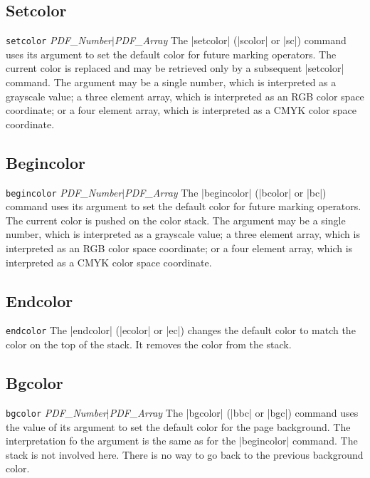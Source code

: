 {\subsection{Setcolor}
\syntax
{\tt setcolor} {\it PDF\_Number$\vert$\it PDF\_Array}
\description
The |setcolor| (|scolor| or |sc|) command uses its
argument to set the default color for future marking operators.
The current color is replaced and may be retrieved
only by a subsequent |setcolor| command.  The argument
may be a single number, which is interpreted as a grayscale
value; a three element array, which is interpreted as an RGB
color space coordinate; or a four element array, which
is interpreted as a CMYK color space coordinate.
\example
\begintt
{}
\endtt

\subsection{Begincolor}
\syntax
{\tt begincolor} {\it PDF\_Number$\vert$\it PDF\_Array}
\description
The |begincolor| (|bcolor| or |bc|) command uses its
argument to set the default color for future marking operators.
The current color is pushed on the color stack.  The argument
may be a single number, which is interpreted as a grayscale
value; a three element array, which is interpreted as an RGB
color space coordinate; or a four element array, which
is interpreted as a CMYK color space coordinate.
\example
\begintt
{}
\endtt

\subsection{Endcolor}
\syntax
{\tt endcolor}
\description
The |endcolor| (|ecolor| or |ec|)
changes the default color to
match the color on the top
of the stack.  It removes
the color from the stack.
\example
\begintt
{}
\endtt

\subsection{Bgcolor}
\syntax
{\tt bgcolor} {\it PDF\_Number$\vert$\it PDF\_Array}
\description
The |bgcolor| (|bbc| or |bgc|) command uses the value
of its argument to set the default color for the page
background.  The interpretation
fo the argument is the same as for the |begincolor| command.
The stack is not involved here.  There is no way
to go back to the previous background color.
\example
\begintt
{}
\endtt

}
